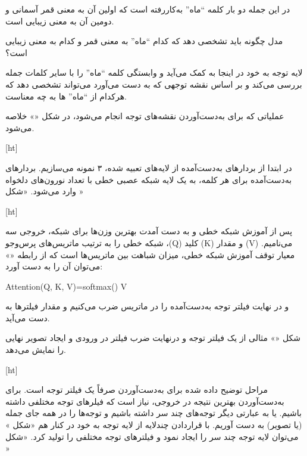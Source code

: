 در این جمله دو بار کلمه ``ماه'' به‌کاررفته است که اولین آن به معنی قمر آسمانی و دومین آن به معنی زیبایی است.

مدل چگونه باید تشخصی دهد که کدام ``ماه'' به معنی قمر و کدام به معنی زیبایی است؟ 

لایه توجه به خود در اینجا به کمک می‌آید و وابستگی کلمه ``ماه'' را با سایر کلمات جمله بررسی می‌کند و بر اساس نقشه توجهی که به دست می‌آورد می‌تواند تشخصی دهد که هرکدام از ``ماه'' ها به چه معناست.



عملیاتی که برای به‌دست‌آوردن نقشه‌های توجه انجام می‌شود، در شکل «» خلاصه می‌شود.



[ht]


در ابتدا از بردار‌های به‌دست‌آمده از لایه‌های تعبیه شده، ۳ نمونه می‌سازیم. بردار‌های به‌دست‌آمده برای هر کلمه، به یک لایه شبکه عصبی خطی با تعداد نورون‌های دلخواه وارد می‌شود. «شکل »




[ht]


پس از آموزش شبکه خطی و به دست آمدت بهترین وزن‌ها برای شبکه، خروجی سه شبکه خطی را به ترتیب ماتریس‌های پرس‌وجو ،(Q) کلید (K) و مقدار (V) می‌نامیم. معیار توقف آموزش شبکه خطی، میزان شباهت بین ماتریس‌ها است که از رابطه «» می‌توان آن را به دست آورد:


Attention(Q, K, V)=softmax() \cdot V



و در نهایت فیلتر توجه به‌دست‌آمده را در ماتریس  ضرب می‌کنیم و مقدار فیلترها به دست می‌آید.

شکل «» مثالی از یک فیلتر توجه و درنهایت ضرب فیلتر در ورودی و ایجاد تصویر نهایی را نمایش می‌دهد.




[ht]



مراحل توضیح داده شده برای به‌دست‌آوردن صرفاً یک فیلتر توجه است. برای به‌دست‌آوردن بهترین نتیجه در خروجی، نیاز است که فیلرهای توجه مختلفی داشته باشیم. یا به عبارتی دیگر توجه‌های چند سر داشته باشیم و توجه‌ها را در همه جای جمله (یا تصویر) به دست آوریم. با قراردادن چندلایه از لایه توجه به خود در کنار هم «شکل » می‌توان لایه توجه چند سر را ایجاد نمود و فیلتر‌های توجه مختلفی را تولید کرد. «شکل »




